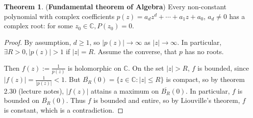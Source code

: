 \documentclass[12pt,a4paper]{article}
\theoremstyle{definition}
\newtheorem{theorem}[definition]{Theorem}
\begin{document}
\begin{theorem}
	(\textbf{Fundamental theorem of Algebra}) Every non-constant polynomial with complex coefficients $p(z) = a_d z^d + \cdots + a_1 z + a_0$, $a_d \ne 0$ has a complex root: for some $z_0 \in \mathbb{C}, P(z_0) = 0$.
\end{theorem}

\begin{proof}
	By assumption, $d \ge 1$, so $|p(z)| \rightarrow \infty$ as $|z| \rightarrow \infty$. In particular, $\exists R > 0, |p(z)| > 1$ if $|z| = R$. Assume the converse, that $p$ has no roots.

	Then $f(z) := \frac{1}{p(z)}$ is holomorphic on $\mathbb{C}$. On the set $|z| > R$, $f$ is bounded, since $|f(z)| = \frac{1}{|p(z)|} < 1$. But $\overline{B_R}(0) = \{ z \in \mathbb{C}: |z| \le R \}$ is compact, so by theorem 2.30 (lecture notes), $|f(z)|$ attains a maximum on $\overline{B_R}(0)$. In particular, $f$ is bounded on $\overline{B_R}(0)$. Thus $f$ is bounded and entire, so by Liouville's theorem, $f$ is constant, which is a contradiction.
\end{proof}
\end{document}
